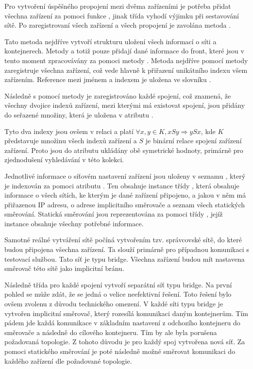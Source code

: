 Pro vytvoření úspěšného propojení mezi dvěma zařízeními je potřeba přidat všechna zařízení za pomoci funkce , jinak třída vyhodí výjimku při sestavování sítě. Po zaregistrovaní všech zařízení a všech propojení je zavolána metoda . 

Tato metoda nejdříve vytvoří strukturu uložení všech informací o síti a kontejnerech. Metody  a  totiž pouze přidají dané informace do front, které jsou v tento moment zpracovávány za pomoci metody . Metoda nejdříve pomocí metody  zaregistruje všechna zařízení, což vede hlavně k přiřazení unikátního indexu všem zařízením. Reference mezi jménem a indexem je uložena ve slovníku . 

Následně s pomocí metody  je zaregistrováno každé spojení, což znamená, že všechny dvojice indexů zařízení, mezi kterými má existovat spojení, jsou přidány do seřazené množiny, která je uložena v atributu . 

Tyto dva indexy jsou ovšem v relaci a platí $\forall x,y \in K, xSy \Rightarrow ySx$, kde $K$ představuje množinu všech indexů zařízení a $S$ je binární relace spojení zařízení zařízení. Proto  jsou do atributu  ukládány obě symetrické hodnoty, primárně pro zjednodušení vyhledávání v této kolekci.

Jednotlivé informace o síťovém nastavení zařízení jsou uloženy v seznamu , který je indexován za pomoci atributu . Ten obsahuje instance třídy , která obsahuje informace o všech sítích, ke kterým je dané zařízení připojeno, a jakou v něm má přiřazenou IP adresu, o adrese implicitního směrovače a seznam všech statických směrování. Statická směrování jsou reprezentována za pomoci třídy , jejíž instance obsahuje všechny potřebné informace. 

Samotné reálné vytváření sítě počíná vytvořením tzv. správcovské sítě, do které budou připojena všechna zařízení. Ta slouží primárně pro případnou komunikaci s testovací službou. Tato síť je typu bridge. Všechna zařízení budou mít nastavena směrovač této sítě jako implicitní bránu.

Následně třída pro každé spojení vytvoří separátní síť typu bridge. Na první pohled se může zdát, že se jedná o velice neefektivní řešení. Toto řešení bylo ovšem zvolenu z důvodu technického omezení. V každé síti typu bridge je vytvořen implicitní směrovač, který rozesílá komunikaci daným kontejnerům. Tím pádem jde každá komunikace v základním nastavení z odchozího kontejneru do směrovače a následně do cílového kontejneru. Tím by ale byla porušena požadovaná topologie. Z tohoto důvodu je pro každý spoj vytvořena nová síť. Za pomoci statického směrování je poté následně možné směrovat komunikaci do každého zařízení dle požadované topologie. 

